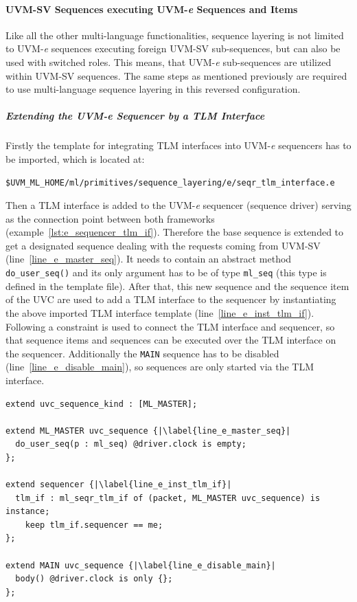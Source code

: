 \paragraph{UVM-SV Sequences executing UVM-\textit{e} Sequences and Items}
Like all the other multi-language functionalities, sequence layering is not limited to UVM-\textit{e} sequences executing foreign UVM-SV sub-sequences, but can also be used with switched roles. This means, that UVM-\textit{e} sub-sequences are utilized within UVM-SV sequences. The same steps as mentioned previously are required to use multi-language sequence layering in this reversed configuration. 
\subparagraph{Extending the UVM-\textit{e} Sequencer by a TLM Interface}\label{e_seqr_tlm}
Firstly the template for integrating TLM interfaces into UVM-\textit{e} sequencers has to be imported, which is located at:
\smallskip
{}
\begin{lstlisting}
$UVM_ML_HOME/ml/primitives/sequence_layering/e/seqr_tlm_interface.e
\end{lstlisting} 
\smallskip
Then a TLM interface is added to the UVM-\textit{e} sequencer (sequence driver) serving as the connection point between both frameworks (example~\ref{lst:e_sequencer_tlm_if}). Therefore the base sequence is extended to get a designated sequence dealing with the requests coming from UVM-SV (line~\ref{line_e_master_seq}). It needs to contain an abstract method \lstinline$do_user_seq()$ and its only argument has to be of type \lstinline$ml_seq$ (this type is defined in the template file).
After that, this new sequence and the sequence item of the UVC are used to add a TLM interface to the sequencer by instantiating the above imported TLM interface template (line~\ref{line_e_inst_tlm_if}). Following a constraint is used to connect the TLM interface and sequencer, so that sequence items and sequences can be executed over the TLM interface on the sequencer.
Additionally the \lstinline$MAIN$ sequence has to be disabled (line~\ref{line_e_disable_main}), so sequences are only started via the TLM interface.
\lstset{language=e, numbers = left, escapechar=|, breaklines=true}
\begin{lstlisting}[frame=htrbl, caption={\textit{e}: adding a TLM interface to the UVM-\textit{e} sequencer},
label={lst:e_sequencer_tlm_if}]
extend uvc_sequence_kind : [ML_MASTER];

extend ML_MASTER uvc_sequence {|\label{line_e_master_seq}|
  do_user_seq(p : ml_seq) @driver.clock is empty;
};

extend sequencer {|\label{line_e_inst_tlm_if}|
  tlm_if : ml_seqr_tlm_if of (packet, ML_MASTER uvc_sequence) is instance;
    keep tlm_if.sequencer == me;
};

extend MAIN uvc_sequence {|\label{line_e_disable_main}|
  body() @driver.clock is only {};
};
\end{lstlisting}
